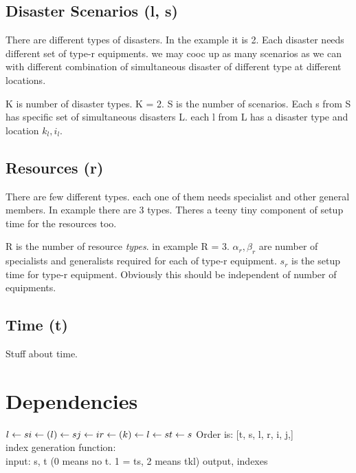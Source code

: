 \documentclass[11pt]{article}
\DeclareRobustCommand{\mybox}[2][gray!20]{%
\begin{tcolorbox}[   %
        breakable,
        left=0pt,
        right=0pt,
        top=0pt,
        bottom=0pt,
        colback=#1,
        colframe=#1,
        width=\dimexpr\textwidth\relax, 
        enlarge left by=0mm,
        boxsep=5pt,
        arc=0pt,outer arc=0pt,
        ]
        #2
\end{tcolorbox}
}
\begin{document}
\subsection{Disaster Scenarios (l, s)}
There are different types of disasters. In the example it is 2. Each disaster needs different set of type-r equipments. we may cooc up as many scenarios as we can with different combination of simultaneous disaster of different type at different locations.  
\mybox[green!10]{K is number of disaster types. K = 2. S is the number of scenarios. Each s from S has specific set of simultaneous disasters L. each l from L has a disaster type and location $k_l, i_l$.}

\subsection{Resources (r)} There are few different types. each one of them needs specialist and other general members. In example there are 3 types. Theres a teeny tiny  component of setup time for the resources too. 
\mybox[green!10]{R is the number of resource \textit{types}. in example R = 3. $\alpha_r, \beta_r$ are number of specialists and generalists required for each of type-r equipment. $s_r$ is the setup time for type-r equipment. Obviously this should be independent of number of equipments.}
\subsection{Time (t)}
Stuff about time.

\section{Dependencies}
$
l \leftarrow s\\
i \leftarrow (l) \leftarrow s\\
j \leftarrow i\\
r \leftarrow (k) \leftarrow l \leftarrow s \\
t \leftarrow s\\
$
Order is: [t, s, l, r, i, j,]\\
index generation function:\\
input: s, t (0 means no t. 1 = ts, 2 means tkl)
output, indexes
\end{document}
